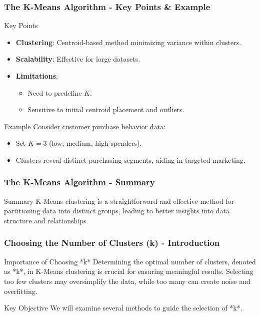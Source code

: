 \documentclass[aspectratio=169]{beamer}
\begin{document}
\begin{frame}[fragile]
    \frametitle{The K-Means Algorithm - Key Points & Example}
    \begin{block}{Key Points}
        \begin{itemize}
            \item \textbf{Clustering}: Centroid-based method minimizing variance within clusters.
            \item \textbf{Scalability}: Effective for large datasets.
            \item \textbf{Limitations}:
                \begin{itemize}
                    \item Need to predefine \( K \).
                    \item Sensitive to initial centroid placement and outliers.
                \end{itemize}
        \end{itemize}
    \end{block}

    \begin{block}{Example}
        Consider customer purchase behavior data:
        \begin{itemize}
            \item Set \( K=3 \) (low, medium, high spenders).
            \item Clusters reveal distinct purchasing segments, aiding in targeted marketing.
        \end{itemize}
    \end{block}
\end{frame}

\begin{frame}[fragile]
    \frametitle{The K-Means Algorithm - Summary}
    \begin{block}{Summary}
        K-Means clustering is a straightforward and effective method for partitioning data into distinct groups, leading to better insights into data structure and relationships.
    \end{block}
\end{frame}

\begin{frame}[fragile]
  \frametitle{Choosing the Number of Clusters (k) - Introduction}
  \begin{block}{Importance of Choosing *k*}
    Determining the optimal number of clusters, denoted as *k*, in K-Means clustering is crucial for ensuring meaningful results. Selecting too few clusters may oversimplify the data, while too many can create noise and overfitting. 
  \end{block}
  
  \begin{block}{Key Objective}
    We will examine several methods to guide the selection of *k*.
  \end{block}
\end{frame}
\end{document}
